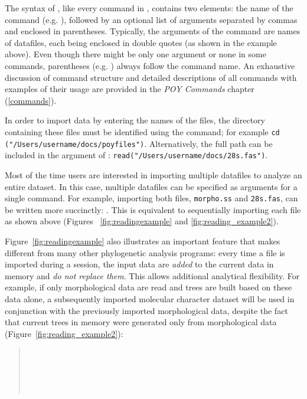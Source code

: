 The syntax of , like every command in \poy, contains two elements: the name of the command (e.g. ), followed by an optional list of arguments 
separated by commas and enclosed in parentheses. Typically, the arguments of the command  are names of datafiles, each being enclosed in double quotes (as shown in the example above). Even though there might be only one argument or none in some commands, parentheses (e.g. ) always follow the command name. An exhaustive discussion of \poy command structure and detailed descriptions of all commands with examples of their usage are provided in the \emph{POY Commands} chapter (\ref{commands}).

In order to import data by entering the names of the files, the directory containing these files must be identified using the command; for example \texttt{cd ("/Users/username/docs/poyfiles")}. Alternatively, the full path can be included in the argument of : \texttt{read("/Users/username/docs/28s.fas")}.

Most of the time users are interested in importing multiple datafiles to analyze an entire dataset. In this case, multiple datafiles can be specified as arguments for a single command. For example, importing both files, \texttt{morpho.ss} and \texttt{28s.fas}, can be written more succinctly:
. This is equivalent to sequentially importing each file as shown above (Figures ~\ref{fig:readingexample} and \ref{fig:reading_example2}).

Figure~\ref{fig:readingexample} also illustrates an important feature that makes \poy different from many other phylogenetic analysis programs: every time a file is imported during a \poy session, the input data are \emph{added} to the current data in memory and \emph{do not replace them}. This allows additional analytical flexibility. For example, if only morphological data are read and trees are built based on these data alone, a subsequently imported molecular character dataset will be used in conjunction with the previously imported morphological data, despite the fact that current trees in memory were generated only from morphological data (Figure~\ref{fig:reading_example2}):

\begin{quote}
\\
\\
\\
\\
\end{quote}

